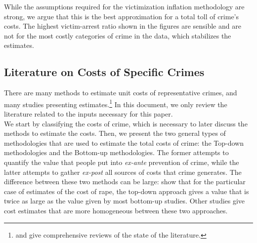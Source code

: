 \noindent While the assumptions required for the victimization inflation methodology are strong, we argue that this is the best approximation for a total toll of crime's costs. The highest victim-arrest ratio shown in the figures are sensible and are not for the most costly categories of crime in the data, which stabilizes the estimates. \\

\subsection{Literature on Costs of Specific Crimes}
\noindent There are many methods to estimate unit costs of representative crimes, and many studies presenting estimates.\footnote{\citet{Cohen-Bowles_2010_Estimating-Cost-Crime} and \citet{McCollister_etal_2010_DAD} give comprehensive reviews of the state of the literature.} In this document, we only review the literature related to the inputs necessary for this paper. \\

\noindent We start by classifying the costs of crime, which is necessary to later discuss the methods to estimate the costs. Then, we present the two general types of methodologies that are used to estimate the total costs of crime: the Top-down methodologies and the Bottom-up methodologies. The former attempts to quantify the value that people put into \emph{ex-ante} prevention of crime, while the latter attempts to gather \emph{ex-post} all sources of costs that crime generates. The difference between these two methods can be large: \cite{Cohen-Bowles_2010_Estimating-Cost-Crime} show that for the particular case of estimates of the cost of rape, the top-down approach gives a value that is twice as large as the value given by most bottom-up studies. Other studies give cost estimates that are more homogeneous between these two approaches.\\

